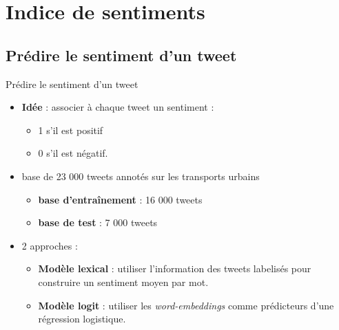 \documentclass[10pt,xcolor=table,color={dvipsnames,usenames},ignorenonframetext,usepdftitle=false,french]{beamer}
\providecommand{\tightlist}{%
  \setlength{\parskip}{0pt}
  }
\begin{document}
\hypertarget{indice-de-sentiments}{%
\section{Indice de sentiments}\label{indice-de-sentiments}}

\hypertarget{pruxe9dire-le-sentiment-dun-tweet}{%
\subsection{Prédire le sentiment d'un
tweet}\label{pruxe9dire-le-sentiment-dun-tweet}}

\begin{frame}{Prédire le sentiment d'un tweet}
\protect\hypertarget{pruxe9dire-le-sentiment-dun-tweet-1}{}

\begin{itemize}
\tightlist
\item
  \textbf{Idée} : associer à chaque tweet un sentiment :

  \begin{itemize}
  \tightlist
  \item
    1 s'il est positif
  \item
    0 s'il est négatif.
  \end{itemize}
\end{itemize}

\medskip

\begin{itemize}
\tightlist
\item
  base de 23 000 tweets annotés sur les transports urbains

  \begin{itemize}
  \tightlist
  \item
    \textbf{base d'entraînement} : 16 000 tweets
  \item
    \textbf{base de test} : 7 000 tweets
  \end{itemize}
\end{itemize}

\medskip

\begin{itemize}
\tightlist
\item
  2 approches :

  \begin{itemize}
  \tightlist
  \item
    \textbf{Modèle lexical} : utiliser l'information des tweets
    labelisés pour construire un sentiment moyen par mot.
  \item
    \textbf{Modèle logit} : utiliser les \emph{word-embeddings} comme
    prédicteurs d'une régression logistique.
  \end{itemize}
\end{itemize}

\end{frame}
\end{document}
